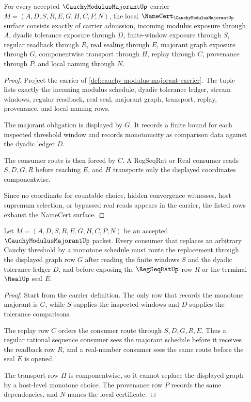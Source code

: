 \begin{theorem}
\label{thm:cauchy-modulus-majorant-namecert-obligations}
For every accepted $\CauchyModulusMajorantUp$ carrier $M=(A,D,S,R,E,G,H,C,P,N)$, the local $\NameCert_{\CauchyModulusMajorantUp}$ surface consists exactly of carrier admission, incoming modulus exposure through $A$, dyadic tolerance exposure through $D$, finite-window exposure through $S$, regular readback through $R$, real sealing through $E$, majorant graph exposure through $G$, componentwise transport through $H$, replay through $C$, provenance through $P$, and local naming through $N$.
\end{theorem}
\begin{proof}
Project the carrier of \autoref{def:cauchy-modulus-majorant-carrier}. The tuple lists exactly the incoming modulus schedule, dyadic tolerance ledger, stream windows, regular readback, real seal, majorant graph, transport, replay, provenance, and local naming rows.

The majorant obligation is displayed by $G$. It records a finite bound for each inspected threshold window and records monotonicity as comparison data against the dyadic ledger $D$.

The consumer route is then forced by $C$. A RegSeqRat or Real consumer reads $S,D,G,R$ before reaching $E$, and $H$ transports only the displayed coordinates componentwise.

Since no coordinate for countable choice, hidden convergence witnesses, host supremum selection, or bypassed real reads appears in the carrier, the listed rows exhaust the NameCert surface.
\end{proof}

\begin{theorem}
\label{thm:cauchy-modulus-majorant-normalization-route}
Let $M=(A,D,S,R,E,G,H,C,P,N)$ be an accepted $\CauchyModulusMajorantUp$ packet. Every consumer that replaces an arbitrary Cauchy threshold by a monotone schedule must route the replacement through the displayed graph row $G$ after reading the finite windows $S$ and the dyadic tolerance ledger $D$, and before exposing the $\RegSeqRatUp$ row $R$ or the terminal $\RealUp$ seal $E$.
\end{theorem}
\begin{proof}
Start from the carrier definition. The only row that records the monotone majorant is $G$, while $S$ supplies the inspected windows and $D$ supplies the tolerance comparisons.

The replay row $C$ orders the consumer route through $S,D,G,R,E$. Thus a regular rational sequence consumer sees the majorant schedule before it receives the readback row $R$, and a real-number consumer sees the same route before the seal $E$ is opened.

The transport row $H$ is componentwise, so it cannot replace the displayed graph by a host-level monotone choice. The provenance row $P$ records the same dependencies, and $N$ names the local certificate.
\end{proof}


